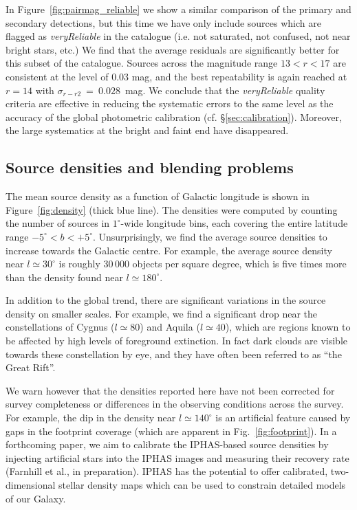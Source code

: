 \documentclass[useAMS,usenatbib]{mn2e}
\begin{document}
In Figure~\ref{fig:pairmag_reliable} we show 
a similar comparison of the primary and secondary detections,
but this time we have only include sources which are flagged
as \emph{veryReliable} in the catalogue
(i.e. not saturated, not confused, not near bright stars, etc.)
We find that the average residuals are significantly better
for this subset of the catalogue. Sources across the magnitude range 
$13 < r < 17$ are consistent at the level of 0.03 mag,
and the best repeatability is again reached at $r=14$
with $\sigma_{r-r2}~=~0.028$~mag.
We conclude that the \emph{veryReliable} quality criteria are effective
in reducing the systematic errors to
the same level as the accuracy of the
global photometric calibration (cf. \S\ref{sec:calibration}).
Moreover, the large systematics at the bright and faint end
have disappeared.

\subsection{Source densities and blending problems}
\label{sec:densities}

The mean source density as a function of Galactic longitude
is shown in Figure~\ref{fig:density} (thick blue line).
The densities were computed by counting the 
number of sources in $1^\circ$-wide longitude bins,
each covering the entire latitude range $-5^\circ<b<+5^\circ$.
Unsurprisingly, we find the average source densities to increase
towards the Galactic centre.
For example, the average source density near $l\simeq 30^\circ$
is roughly 30\,000 objects per square degree,
which is five times more than the density
found near $l\simeq 180^\circ$.

In addition to the global trend, 
there are significant variations
in the source density on smaller scales.
For example,  we find a significant drop near the constellations 
of Cygnus ($l\simeq 80$) and Aquila ($l\simeq 40$),
which are regions known to be affected
by high levels of foreground extinction.
In fact dark clouds are visible towards these constellation by eye,
and they have often been referred to as ``the Great Rift''.

We warn however that the densities reported here 
have not been corrected for survey completeness
or differences in the observing conditions across the survey.
For example, the dip in the density near $l\simeq140^\circ$
is an artificial feature caused by gaps
in the footprint coverage (which are apparent in Fig.~\ref{fig:footprint}).
In a forthcoming paper,
we aim to calibrate the IPHAS-based source densities
by injecting artificial stars into the IPHAS images
and measuring their recovery rate (Farnhill et al., in preparation).
IPHAS has the potential to offer
calibrated, two-dimensional stellar density maps
which can be used to constrain detailed models of our Galaxy.
\end{document}

